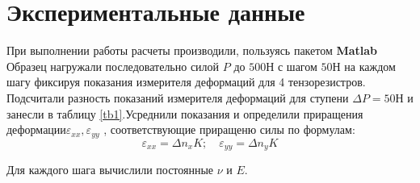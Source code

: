 \documentclass[12pt, a4paper]{article}
\begin{document}
\newpage
\section*{Экспериментальные данные}
	При выполнении работы расчеты производили, пользуясь пакетом \textbf{Matlab} \\
	Образец нагружали последовательно силой $P$ до $500 Н$ с шагом $ 50Н $ на каждом шагу фиксируя показания измерителя деформаций для 4 тензорезистров. Подсчитали разность показаний измерителя деформаций для ступени $\Delta P = 50 Н$ и занесли в таблицу \ref{tb1}.Усреднили показания и определили приращения деформации$ \varepsilon_{xx}, \varepsilon_{yy}$ , соответствующие приращеню силы по формулам:
	\begin{equation}
	\varepsilon_{xx} = \Delta n_{x} K; \quad \varepsilon_{yy} = \Delta n_{y}K
	\end{equation}

Для каждого шага вычислили постоянные $\nu$ и $ E $.
\end{document}
